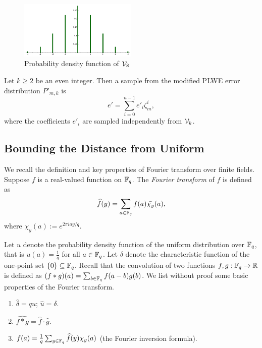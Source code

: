 \documentclass[envcountsame]{llncs}
\begin{document}
\begin{figure}[h!]
\centering
\includegraphics[width = 0.5\textwidth]{v8.png}
\caption{Probability density function of $\mathcal{V}_{8}$}
\label{fig: v8}
\end{figure}


\begin{definition}
\label{def: modified distribution}
Let $k \geq 2$ be an even integer. Then a sample from the modified PLWE error distribution $P'_{m,k}$ is
\[
    e' = \sum_{i=0}^{n-1} e'_i \zeta_m^{i},
\]
where the coefficients $e'_i$ are sampled independently from $\mathcal{V}_k$.
\end{definition}




\subsection{Bounding the Distance from Uniform}

We recall the definition and key properties of Fourier transform over finite fields.
Suppose $f$ is a real-valued function on $\mathbb{F}_q$. The {\it Fourier transform} of $f$ is defined as
\[
    \widehat{f}(y) = \sum_{a \in \mathbb{F}_q} f(a) \bar{\chi_y}(a),
\]
where $\chi_y(a) := e^{2 \pi i ay/q}$.

Let $u$ denote the probability density function of the uniform distribution over $\mathbb{F}_q$, that is $u(a) = \frac{1}{q}$ for all $a \in \mathbb{F}_q$. Let $\delta$ denote the characteristic function of the
one-point set $\{0\} \subseteq \mathbb{F}_q$. Recall that the convolution of two functions $f,g: \mathbb{F}_q \to \mathbb{R}$ is
defined as $(f  \ast g ) (a) = \sum_{b \in \mathbb{F}_q} f(a-b)g(b)$. We list without proof some basic properties of the Fourier transform.
\begin{enumerate}
\item $\widehat{\delta} = qu$; $\widehat{u} = \delta$.
\item $\widehat{f \ast g} = \widehat{f} \cdot \widehat{g}$.
\item $f(a) = \frac{1}{q} \sum_{y \in \mathbb{F}_q} \widehat{f}(y)\chi_y(a)$ (the Fourier inversion formula).
\end{enumerate}
\end{document}
